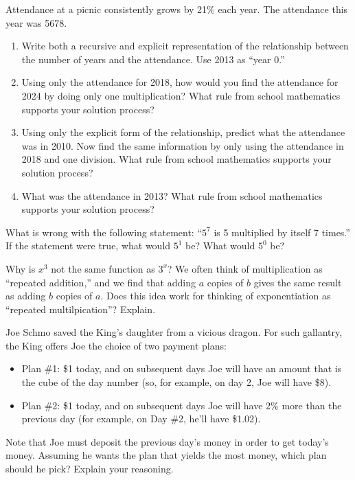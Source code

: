 \documentclass[justified,openany,nofonts]{tufte-book}
\begin{document}
\begin{prob}
Attendance at a picnic consistently grows by 21\% each year.  The attendance this year was 5678.    
\begin{enumerate}
\item Write both a recursive and explicit representation of the relationship between the number of years and the attendance.  Use 2013 as ``year 0.''

\item Using only the attendance for 2018, how would you find the attendance for 2024 by doing only one multiplication?  What rule from school mathematics supports your solution process?
      
\item Using only the explicit form of the relationship, predict what the attendance was in 2010.  Now find the same information by only using the attendance in 2018 and one division. What rule from school mathematics supports your solution process?
     
\item What was the attendance in 2013?  What rule from school mathematics supports your solution process?
\end{enumerate}
\end{prob}
\begin{prob}
What is wrong with the following statement:  ``$5^7$ is 5 multiplied by itself 7 times.''  If the statement were true, what would $5^1$ be?  What would $5^0$ be?
\end{prob}
\begin{prob}
Why is $x^3$ not the same function as $3^x$?  We often think of multiplication as ``repeated addition,'' and we find that adding $a$ copies of $b$ gives the same result as adding $b$ copies of $a$.  Does this idea work for thinking of exponentiation as ``repeated multilpication''?  Explain.  
\end{prob}

\begin{prob}
Joe Schmo saved the King's daughter from a vicious dragon.  For such gallantry, the King offers Joe the choice of two payment plans: 
\begin{itemize}
\item Plan \#1:  \$1 today, and on subsequent days Joe will have an amount that is the cube of the day number (so, for example, on day 2, Joe  will have \$8). 
\item Plan \#2:  \$1 today, and on subsequent days Joe will have 2\% more than the previous day (for example, on Day \#2, he'll have \$1.02).  
\end{itemize}
Note that Joe must deposit the previous day's money in order to get today's money.  Assuming he wants the plan that yields the most money, which plan should he pick?  Explain your reasoning.  
\end{prob}
\end{document}
